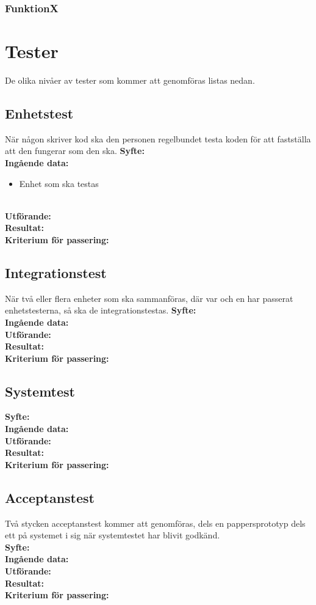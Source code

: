 \documentclass[a4paper,10pt]{article}
\begin{document}
    \subsubsection{FunktionX}

\section{Tester}
De olika nivåer av tester som kommer att genomföras listas nedan.
\subsection{Enhetstest}
När någon skriver kod ska den personen regelbundet testa koden för att fastställa att den fungerar som den ska.
  \textbf{Syfte:}
    \\ \textbf{Ingående data:}
    \begin{itemize}
        \item Enhet som ska testas
    \end{itemize}
    \\ \textbf{Utförande:}
    \\ \textbf{Resultat:}
    \\ \textbf{Kriterium för passering:}
\subsection{Integrationstest}
När två eller flera enheter som ska sammanföras, där var och en har passerat enhetstesterna, så ska de integrationstestas.
   \textbf{Syfte:}
    \\ \textbf{Ingående data:}
    \\ \textbf{Utförande:}
    \\ \textbf{Resultat:}
    \\ \textbf{Kriterium för passering:}
\subsection{Systemtest}
   \textbf{Syfte:}
    \\ \textbf{Ingående data:}
    \\ \textbf{Utförande:}
    \\ \textbf{Resultat:}
    \\ \textbf{Kriterium för passering:}
\subsection{Acceptanstest}
Två stycken acceptanstest kommer att genomföras, dels en pappersprototyp dels ett på systemet i sig när systemtestet har blivit godkänd.
    \\ \textbf{Syfte:}
    \\ \textbf{Ingående data:}
    \\ \textbf{Utförande:}
    \\ \textbf{Resultat:}
    \\ \textbf{Kriterium för passering:}
\end{document}
